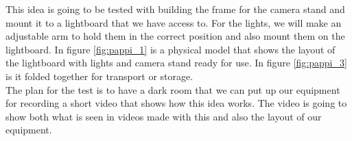 \documentclass[a4paper]{jpconf}
\begin{document}
	
	
	
	
	
	
	
	
	
	
	
	This idea is going to be tested with building the frame for the camera stand and mount it to a lightboard that we have access to.
	For the lights, we will make an adjustable arm to hold them in the correct position and also mount them on the lightboard.
	In figure \ref{fig:pappi_1} is a physical model that shows the layout of the lightboard with lights and camera stand ready for use.
	In figure \ref{fig:pappi_3} is it folded together for transport or storage.\\
	The plan for the test is to have a dark room that we can put up our equipment for recording a short video that shows how this idea works.
	The video is going to show both what is seen in videos made with this and also the layout of our equipment.
	
\end{document}
